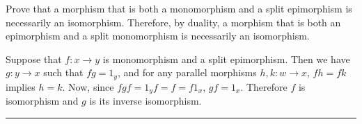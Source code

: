 \begin{exer} Prove that a morphism that is both a monomorphism and a split epimorphism is necessarily an isomorphism. Therefore, by duality, a morphism that is both an epimorphism and a split monomorphism is necessarily an isomorphism.
\end{exer}
\begin{solution} Suppose that $f:x\rightarrow y$ is monomorphism and a split epimorphism. Then we have $g:y\rightarrow x$ such that $fg=1_y$, and for any parallel morphisms $h,k:w\rightarrow x$, $fh=fk$ implies $h=k$. Now, since $fgf=1_y f = f = f 1_x$, $gf=1_x$. Therefore $f$ is isomorphism and $g$ is its inverse isomorphism.
\end{solution}
\noindent\rule{\textwidth}{1pt}
\newline